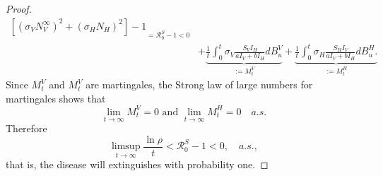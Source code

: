 \begin{proof}
\begin{equation}
\begin{aligned}
{                    \left [
                        \left(
                            \sigma_V N_V ^ \infty
                        \right) ^ 2
                        +
                        \left(
                            \sigma_H N_H
                        \right) ^2
                    \right ] - 1
                }_{=\mathcal{R}_0 ^ S - 1 < 0}
                \\
                & +
                \underbrace{
                    \frac{1}{t}
                    \int_{0}^{t}
                        \sigma_V 
                        \frac{S_V I_H}{a I_V + b I_H}
                    d B_u ^ V
               }_{:=M_t^V}
                +
               \underbrace{
                    \frac{1}{t}
                    \int_{0}^{t}
                        \sigma_H
                        \frac{S_H I_V}{a I_V + b I_H}
                    d B_u ^ H.
               }_{:= M_t ^ H}
        \end{aligned}
    \end{equation}
    Since $M_t^V$ and $M_t^V$ are martingales, the Strong law of large 
    numbers for martingales {\citet[p. 12, Thm. 3.4]{Mao2007}} shows that
    $$
        \lim_{t \to \infty}
            M_t^V = 0 \text{ and }
        \lim_{t \to \infty}
            M_t^H = 0 
        \quad a.s.
    $$    
    Therefore
    $$
        \limsup_{t \to \infty}
            \frac{\ln \rho}{t} <
            \mathcal{R}_0 ^ S - 1 < 0, \quad a.s.,
    $$
    that is, the disease will extinguishes with probability one.
\end{proof}
